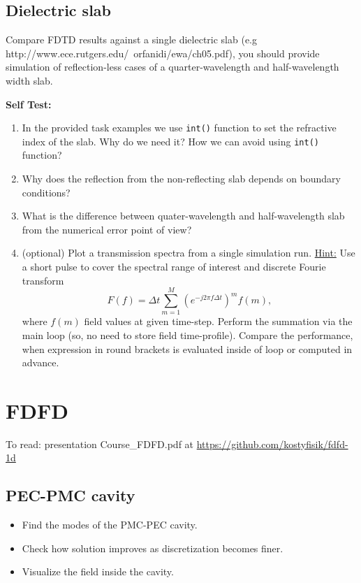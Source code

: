\documentclass[11pt]{article}
\begin{document}
\subsection{Dielectric slab}

Compare FDTD results against a single dielectric slab (e.g
http://www.ece.rutgers.edu/~orfanidi/ewa/ch05.pdf), you should provide
simulation of reflection-less cases of a quarter-wavelength and
half-wavelength width  slab.

\textbf{Self Test:}
\begin{enumerate}
\item In the provided task examples we use \verb+int()+ function to set the
  refractive index of the slab. Why do we need it? How we can avoid
  using \verb+int()+ function?
\item Why does the reflection from the non-reflecting slab depends on
  boundary conditions?
\item What is the difference between quater-wavelength and
  half-wavelength slab from the numerical error point of view?
\item (optional) Plot a transmission spectra from a single simulation run. \underline{Hint:} Use a short pulse to cover the spectral range of interest and discrete Fourie transform $$F(f) = \Delta t \sum_{m=1}^M \left(e^{-j 2 \pi f \Delta t}\right)^m f(m),$$ where $f(m)$ field values at given time-step. Perform the summation via the main loop (so, no need to store field time-profile). Compare the performance, when expression in round brackets is evaluated inside of loop or computed in advance.
\end{enumerate}

\section{FDFD}

To read: presentation Course\_FDFD.pdf at \url{https://github.com/kostyfisik/fdfd-1d} 

\subsection{PEC-PMC cavity}
\label{sec:pec-pmc-cavity}
\begin{itemize}
\item Find the modes of the PMC-PEC cavity.
\item Check how solution improves as discretization becomes finer.
\item Visualize the field inside the cavity.
\end{itemize}
\end{document}
